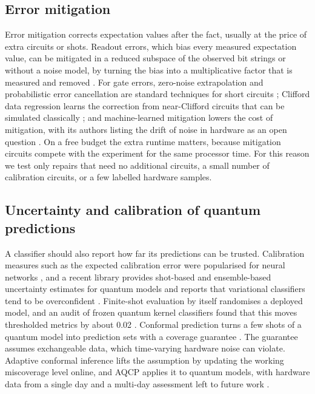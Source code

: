 \documentclass[10pt,conference]{IEEEtran}
\begin{document}
\subsection{Error mitigation}
Error mitigation corrects expectation values after the fact, usually at the price of extra
circuits or shots. Readout errors, which bias every measured expectation value, can be mitigated
in a reduced subspace of the observed bit strings \cite{nation2021m3} or without a noise model,
by turning the bias into a multiplicative factor that is measured and removed
\cite{vandenberg2022trex}. For gate errors, zero-noise extrapolation and probabilistic error
cancellation are standard techniques for short circuits \cite{temme2017zne}; Clifford data
regression learns the correction from near-Clifford circuits that can be simulated classically
\cite{czarnik2021cdr}; and machine-learned mitigation lowers the cost of mitigation, with its
authors listing the drift of noise in hardware as an open question \cite{liao2024mlqem}. On a
free budget the extra runtime matters, because mitigation circuits compete with the experiment
for the same processor time. For this reason we test only repairs that need no additional
circuits, a small number of calibration circuits, or a few labelled hardware samples.

\subsection{Uncertainty and calibration of quantum predictions}
A classifier should also report how far its predictions can be trusted. Calibration measures such
as the expected calibration error were popularised for neural networks \cite{guo2017calibration},
and a recent library provides shot-based and ensemble-based uncertainty estimates for quantum
models and reports that variational classifiers tend to be overconfident \cite{quantumuq2026}.
Finite-shot evaluation by itself randomises a deployed model, and an audit of frozen quantum
kernel classifiers found that this moves thresholded metrics by about 0.02
\cite{fernandezbarrios2026conditional}. Conformal prediction turns a few shots of a quantum
model into prediction sets with a coverage guarantee \cite{park2023qcp}. The guarantee assumes
exchangeable data, which time-varying hardware noise can violate. Adaptive conformal inference
\cite{gibbs2021aci} lifts the assumption by updating the working miscoverage level online, and
AQCP applies it to quantum models, with hardware data from a single day and a multi-day
assessment left to future work \cite{spencer2026aqcp}.
\end{document}
